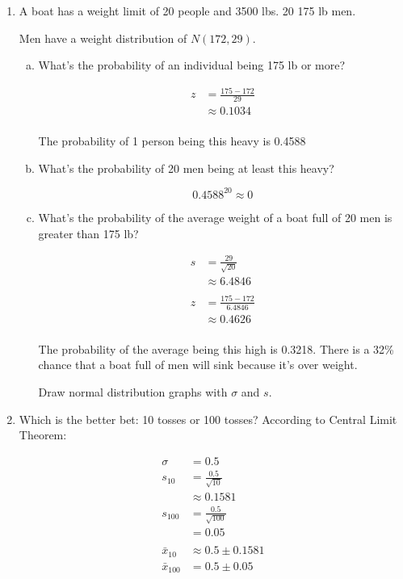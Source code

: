 \documentclass[letterpaper,landscape]{exam}
\begin{document}
  \begin{enumerate}
    \item A boat has a weight limit of 20 people and 3500 lbs.
      20 175 lb men.
      
      Men have a weight distribution of $N(172, 29)$.

      \begin{enumerate}[(a)]
        \item What's the probability of an individual being 175 lb or more?

          \begin{align*}
            z & = \frac{175 - 172}{29} \\
              & \approx 0.1034 \\
          \end{align*}

          The probability of 1 person being this heavy is 0.4588

        \item What's the probability of 20 men being at least this heavy?

          \[
            0.4588^{20} \approx 0
          \]

        \item What's the probability of the average weight of a boat full of 20
          men is greater than 175 lb?

          \begin{align*}
            s & = \frac{29}{\sqrt{20}} \\
              & \approx 6.4846 \\
            \\
            z & = \frac{175 - 172}{6.4846} \\
              & \approx 0.4626 \\
          \end{align*}

          The probability of the average being this high is 0.3218. There is a
          32\% chance that a boat full of men will sink because it's over
          weight.

          Draw normal distribution graphs with $\sigma$ and $s$.

      \end{enumerate}

    \item Which is the better bet: 10 tosses or 100 tosses?
      According to Central Limit Theorem:

      \begin{align*}
        \sigma  & = 0.5 \\
        s_{10}  & = \frac{0.5}{\sqrt{10}} \\
                & \approx 0.1581 \\
        s_{100} & = \frac{0.5}{\sqrt{100}} \\
                & = 0.05 \\
                \\
        \bar{x}_{10}  & \approx 0.5 \pm 0.1581 \\
        \bar{x}_{100} & = 0.5 \pm 0.05 \\
      \end{align*}


\end{enumerate}
\end{document}
